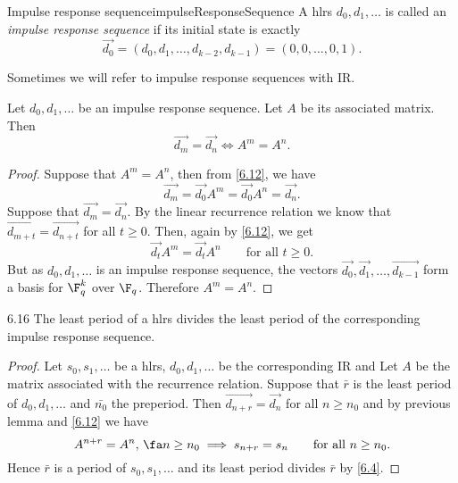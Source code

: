 \begin{defn}{Impulse response sequence}{impulseResponseSequence}
	A hlrs \(d_0,d_1,\ldots\) is called an \emph{impulse response sequence} if its initial state is exactly
	\[
		\vec{d_0} = (d_0,d_1,\ldots,d_{k-2},d_{k-1}) = (0,0,\ldots,0,1).
	\]
\end{defn}

\begin{notz}
	Sometimes we will refer to impulse response sequences with IR.
\end{notz}

\begin{lem}\label{6.15}
	Let \(d_0,d_1,\ldots\) be an impulse response sequence. Let \(A\) be its associated matrix. Then
	\[
		\vec{d_m} = \vec{d_n} \iff A^m = A^n.
	\]
\end{lem}

\begin{proof}
	Suppose that \(A^m = A^n\), then from \autoref{6.12}, we have
	\[
		\vec{d_m} = \vec{d_0}A^m = \vec{d_0}A^n = \vec{d_n}.
	\]
	Suppose that \(\vec{d_m} = \vec{d_n}\). By the linear recurrence relation we know that \(\vec{d_{m+t}} = \vec{d_{n+t}}\) for all \(t\ge 0\). Then, again by \autoref{6.12}, we get
	\[
		\vec{d_t}A^m = \vec{d_t}A^n \qquad\text{for all }t\ge 0.
	\]
	But as \(d_0,d_1,\ldots\) is an impulse response sequence, the vectors \(\vec{d_0},\vec{d_1},\ldots,\vec{d_{k-1}}\) form a basis for \(\F_q^k\) over \(\F_q\). Therefore \(A^m = A^n\).
\end{proof}

\begin{teor}{}{6.16}
	The least period of a hlrs divides the least period of the corresponding impulse response sequence.
\end{teor}

\begin{proof}
	Let \(s_0,s_1,\ldots\) be a hlrs, \(d_0,d_1,\ldots\) be the corresponding IR and Let \(A\) be the matrix associated with the recurrence relation. Suppose that \(\bar{r}\) is the least period of \(d_0,d_1,\ldots\) and \(\bar{n_0}\) the preperiod. Then \(\vec{d_{n+r}} = \vec{d_n}\) for all \(n\ge n_0\) and by previous lemma and \autoref{6.12} we have
	\[
		A^{n+r} = A^n,\,\fa n \ge n_0 \implies s_{n+r} = s_n \qquad\text{for all }n \ge n_0.
	\]
	Hence \(\bar{r}\) is a period of \(s_0,s_1,\ldots\) and its least period divides \(\bar{r}\) by \autoref{6.4}.
\end{proof}

